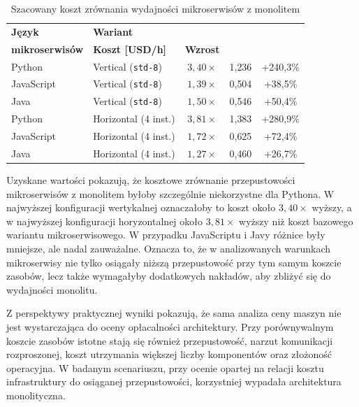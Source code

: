 \begin{table}[H]
    \centering
    \caption{Szacowany koszt zrównania wydajności mikroserwisów z monolitem}
    \label{tab:cost-to-match-monolith}
    \renewcommand{\arraystretch}{1.15}
    \begin{tabular}{|l|l|c|c|c|}
        \hline
        \textbf{Język} & \textbf{Wariant} & \makecell{\textbf{Mnożnik kosztu} \\ \textbf{mikroserwisów}} & \textbf{Koszt [USD/h]} & \textbf{Wzrost} \\
        \hline
        Python & Vertical (\texttt{std-8}) & $3{,}40\times$ & 1{,}236 & +240{,}3\% \\
        JavaScript & Vertical (\texttt{std-8}) & $1{,}39\times$ & 0{,}504 & +38{,}5\% \\
        Java & Vertical (\texttt{std-8}) & $1{,}50\times$ & 0{,}546 & +50{,}4\% \\
        \hline
        Python & Horizontal (4 inst.) & $3{,}81\times$ & 1{,}383 & +280{,}9\% \\
        JavaScript & Horizontal (4 inst.) & $1{,}72\times$ & 0{,}625 & +72{,}4\% \\
        Java & Horizontal (4 inst.) & $1{,}27\times$ & 0{,}460 & +26{,}7\% \\
        \hline
    \end{tabular}
\end{table}

Uzyskane wartości pokazują, że kosztowe zrównanie przepustowości mikroserwisów z monolitem byłoby szczególnie niekorzystne dla Pythona. W najwyższej konfiguracji wertykalnej oznaczałoby to koszt około $3{,}40\times$ wyższy, a w najwyższej konfiguracji horyzontalnej około $3{,}81\times$ wyższy niż koszt bazowego wariantu mikroserwisowego. W przypadku JavaScriptu i Javy różnice były mniejsze, ale nadal zauważalne. Oznacza to, że w analizowanych warunkach mikroserwisy nie tylko osiągały niższą przepustowość przy tym samym koszcie zasobów, lecz także wymagałyby dodatkowych nakładów, aby zbliżyć się do wydajności monolitu.

Z perspektywy praktycznej wyniki pokazują, że sama analiza ceny maszyn nie jest wystarczająca do oceny opłacalności architektury. Przy porównywalnym koszcie zasobów istotne stają się również przepustowość, narzut komunikacji rozproszonej, koszt utrzymania większej liczby komponentów oraz złożoność operacyjna. W badanym scenariuszu, przy ocenie opartej na relacji kosztu infrastruktury do osiąganej przepustowości, korzystniej wypadała architektura monolityczna.

